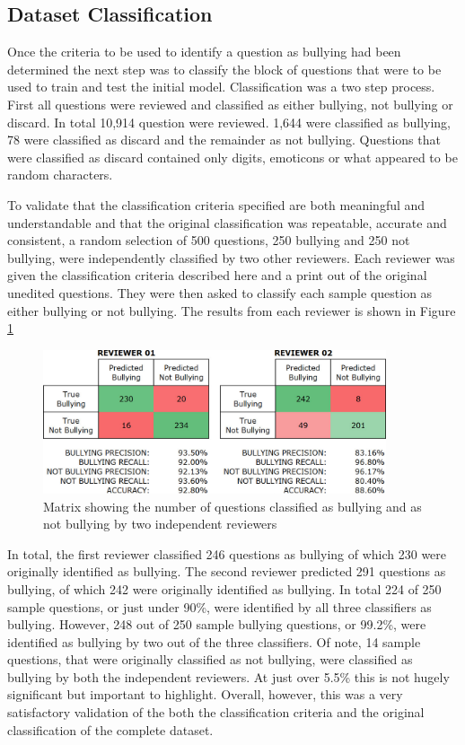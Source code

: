 \subsection{Dataset Classification}
Once the criteria to be used to identify a question as bullying had been determined the next step was to classify the block of questions that were to be used to train and test the initial model. Classification was a two step process. First all questions were reviewed and classified as either bullying, not bullying or discard. In total 10,914 question were reviewed. 1,644 were classified as bullying, 78 were classified as discard and the remainder as not bullying. Questions that were classified as discard contained only digits, emoticons or what appeared to be random characters. 

To validate that the classification criteria specified are both meaningful and understandable and that the original classification was repeatable, accurate and consistent, a random selection of 500 questions, 250 bullying and 250 not bullying, were independently classified by two other reviewers. Each reviewer was given the classification criteria described here and a print out of the original unedited questions. They were then asked to classify each sample question as either bullying or not bullying. The results from each reviewer is shown in Figure \ref{fig:chapter4:reviewer_results}

\begin{figure}[htbp]
	\centering
	\includegraphics[width=0.9\textwidth]{Figures/Chapter4/reviewer_results.jpg}
	\caption[Independent classification review results]{Matrix showing the number of questions classified as bullying and as not bullying by two independent reviewers}
	\label{fig:chapter4:reviewer_results}
\end{figure}

In total, the first reviewer classified 246 questions as bullying of which 230 were originally identified as bullying. The second reviewer predicted 291 questions as bullying, of which 242 were originally identified as bullying. In total 224 of 250 sample questions, or just under 90\%, were identified by all three classifiers as bullying. However, 248 out of 250 sample bullying questions, or 99.2\%, were identified as bullying by two out of the three classifiers. Of note, 14 sample questions, that were originally classified as not bullying, were classified as bullying by both the independent reviewers. At just over 5.5\% this is not hugely significant but important to highlight. Overall, however, this was a very satisfactory validation of the both the classification criteria and the original classification of the complete dataset.

